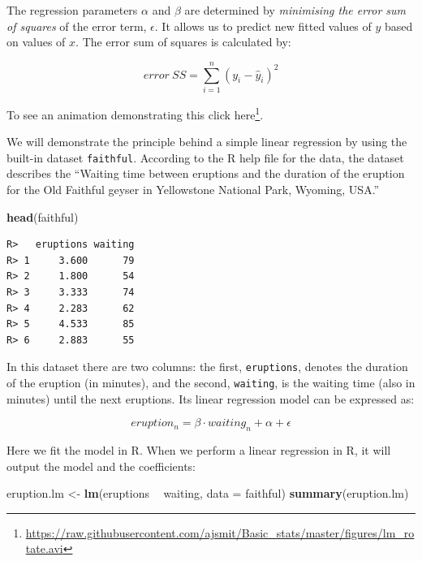 \documentclass[english,10pt,a4paper,oneside]{book}
\renewcommand{\href}[2]{#2\footnote{\url{#1}}}
\let\rmarkdownfootnote\footnote%
\def\footnote{\protect\rmarkdownfootnote}
\newenvironment{Shaded}{\begin{snugshade}}{\end{snugshade}}
\newcommand{\DataTypeTok}[1]{\textcolor[rgb]{0.13,0.29,0.53}{#1}}
\newcommand{\KeywordTok}[1]{\textcolor[rgb]{0.13,0.29,0.53}{\textbf{#1}}}
\newcommand{\NormalTok}[1]{#1}
\newcommand{\OperatorTok}[1]{\textcolor[rgb]{0.81,0.36,0.00}{\textbf{#1}}}
\newcommand{\StringTok}[1]{\textcolor[rgb]{0.31,0.60,0.02}{#1}}
\theoremstyle{definition}
\theoremstyle{definition}
\theoremstyle{definition}
\theoremstyle{remark}
\begin{document}
The regression parameters \(\alpha\) and \(\beta\) are determined by
\emph{minimising the error sum of squares} of the error term,
\(\epsilon\). It allows us to predict new fitted values of \(y\) based
on values of \(x\). The error sum of squares is calculated by:

\[error~SS=\sum_{i=1}^{n}(y_{i}-\hat{y}_{i})^{2}\]

To see an animation demonstrating this click
\href{https://raw.githubusercontent.com/ajsmit/Basic_stats/master/figures/lm_rotate.avi}{here}.

We will demonstrate the principle behind a simple linear regression by
using the built-in dataset \texttt{faithful}. According to the R help
file for the data, the dataset describes the \enquote{Waiting time
between eruptions and the duration of the eruption for the Old Faithful
geyser in Yellowstone National Park, Wyoming, USA.}

\begin{Shaded}
\begin{Highlighting}[]
\KeywordTok{head}\NormalTok{(faithful)}
\end{Highlighting}
\end{Shaded}

\begin{verbatim}
R>   eruptions waiting
R> 1     3.600      79
R> 2     1.800      54
R> 3     3.333      74
R> 4     2.283      62
R> 5     4.533      85
R> 6     2.883      55
\end{verbatim}

In this dataset there are two columns: the first, \texttt{eruptions},
denotes the duration of the eruption (in minutes), and the second,
\texttt{waiting}, is the waiting time (also in minutes) until the next
eruptions. Its linear regression model can be expressed as:

\[eruption_{n}=\beta \cdot waiting_{n}+\alpha+\epsilon\]

Here we fit the model in R. When we perform a linear regression in R, it
will output the model and the coefficients:

\begin{Shaded}
\begin{Highlighting}[]
\NormalTok{eruption.lm <-}\StringTok{ }\KeywordTok{lm}\NormalTok{(eruptions }\OperatorTok{~}\StringTok{ }\NormalTok{waiting, }\DataTypeTok{data =}\NormalTok{ faithful)}
\KeywordTok{summary}\NormalTok{(eruption.lm)}
\end{Highlighting}
\end{Shaded}
\end{document}
